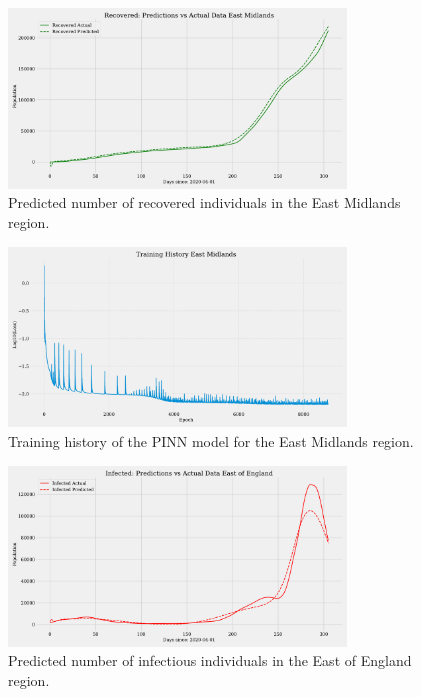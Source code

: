 \documentclass[12pt]{article}
\begin{document}
\begin{figure}[ht]
    \centering
    \includegraphics[width=0.8\textwidth]{images/pinn/R_predictions_East Midlands.pdf}
    \caption{Predicted number of recovered individuals in the East Midlands region.}
    \label{fig:R_predictions_East_Midlands}
\end{figure}

\begin{figure}[ht]
    \centering
    \includegraphics[width=0.8\textwidth]{images/pinn/Training_History_East Midlands.pdf}
    \caption{Training history of the PINN model for the East Midlands region.}
    \label{fig:Training_History_East_Midlands}
\end{figure}

\begin{figure}[ht]
    \centering
    \includegraphics[width=0.8\textwidth]{images/pinn/I_predictions_East of England.pdf}
    \caption{Predicted number of infectious individuals in the East of England region.}
    \label{fig:I_predictions_East_of_England}
\end{figure}
\end{document}
